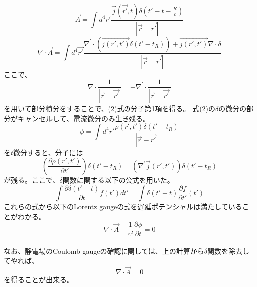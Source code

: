 \documentclass{jarticle}
\title{}
\author{}
\begin{document}
\maketitle

\begin{equation}
\vec{A} = \int d^4r' \frac{\vec{j}(\vec{r'},t)\delta(t'-t-\frac{R}{c})}{|\vec{r}-\vec{r'}|}
\end{equation}
\begin{equation}
\nabla \cdot \vec{A} = \int d^4\vec{r'} \frac{\nabla^\prime\cdot(\vec{j(r',t')}\delta(t'-t_R)) + \vec{j(r',t')}\nabla\cdot\delta}{|\vec{r}-\vec{r'}|}
\end{equation}
ここで、
\begin{equation}
\nabla\cdot\frac{1}{|\vec{r}-\vec{r'}|}=-\nabla^\prime\cdot\frac{1}{|\vec{r}-\vec{r'}|}
\end{equation}
を用いて部分積分をすることで、(2)式の分子第1項を得る。
式(2)の$\delta$の微分の部分がキャンセルして、電流微分のみ生き残る。
\begin{equation}
\phi = \int d^4 r' \frac{\rho(r',t')\delta(t'-t_R)}{|\vec{r}-\vec{r'}|}
\end{equation}
を$t$微分すると、分子には
\begin{equation}
(\frac{\partial \rho(r',t')}{\partial t'})\delta(t'-t_R) =
(\nabla^\prime\vec{j}(r',t'))\delta(t'-t_R)
\end{equation}
が残る。ここで、$\delta$関数に関する以下の公式を用いた。
\begin{equation}
\int \frac{\partial \delta(t'-t)}{\partial t}f(t')dt'=
\int \delta(t'-t)\frac{\partial f}{\partial t'}(t')
\end{equation}
これらの式から以下のLorentz gaugeの式を遅延ポテンシャルは満たしていることがわかる。
\begin{equation}
\nabla\cdot\vec{A} - \frac{1}{c^2}\frac{\partial \phi}{\partial t}=0
\end{equation}
\\

なお、静電場のCoulomb gaugeの確認に関しては、上の計算から$\delta$関数を除去してやれば、
\[ \nabla\cdot \vec{A} = 0\]
を得ることが出来る。
\end{document}
